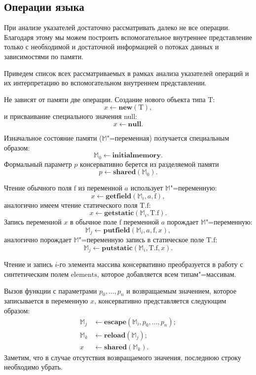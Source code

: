 \documentclass[14pt,titlepage,draft]{extarticle}
\newcommand{\java}{\eng{Java}\xspace}
\newcommand{\M}{\ensuremath{\mathbb{M}}}
\newcommand{\type}[1]{\mathrm{#1}}
\newcommand{\field}[1]{\mathrm{#1}}
\newcommand{\sfield}[2]{\type{#1}.\field{#2}}
\newcommand{\op}[1]{\mathbf{#1}}
\begin{document}
  \subsection{Операции языка \texorpdfstring{\java}{Java}}

    При анализе указателей достаточно рассматривать далеко не все операции.
    Благодаря этому мы можем построить вспомогательное внутреннее
    представление только с необходимой и достаточной информацией о потоках
    данных и зависимостями по памяти.

    Приведем список всех рассматриваемых в рамках анализа указателей операций
    и их интерпретацию во вспомогательном внутреннем представлении.

    Не зависят от памяти две операции. Создание нового объекта типа
    $\type{T}$:
    \[ x \gets \op{new}(\type{T}), \]
    и присваивание специального значения null:
    \[ x \gets \op{null}. \]

    Изначальное состояние памяти (\M"=переменная) получается специальным
    образом:
    \[ \M_0 \gets \op{initialmemory}. \]
    Формальный параметр $p$ консервативно берется из разделяемой памяти
    \[ p \gets \op{shared}(\M_0). \]

    Чтение обычного поля $\field{f}$ из переменной $a$ использует
    \M"=переменную:
    \[ x \gets \op{getfield}(\M_i, a, \field{f}), \]
    аналогично имеем чтение статического поля $\sfield{T}{f}$:
    \[ x \gets \op{getstatic}(\M_i, \sfield{T}{f}). \]
    Запись переменной $x$ в обычное поле $\field{f}$ переменной $a$ порождает
    \M"=переменную:
    \[ \M_j \gets \op{putfield}(\M_i, a, \field{f}, x), \]
    аналогично порождает \M"=переменную запись в статическое поле
    $\sfield{T}{f}$:
    \[ \M_j \gets \op{putstatic}(\M_i, \sfield{T}{f}, x). \]

    Чтение и запись $i$-го элемента массива консервативно преобразуется в
    работу с синтетическим полем $\field{elements}$, которое добавляется всем
    типам"=массивам.

    Вызов функции с параметрами $p_0, \ldots, p_n$ и возвращаемым значением,
    которое записывается в переменную $x$, консервативно представляется
    следующим образом:
    \[\begin{aligned}
      \M_j &\gets \op{escape}(\M_i, p_0, \ldots, p_n); \\
      \M_k &\gets \op{reload}(\M_j); \\
      x    &\gets \op{shared}(\M_k).
    \end{aligned}\]
    Заметим, что в случае отсутствия возвращаемого значения, последнюю строку
    необходимо убрать.
\end{document}
